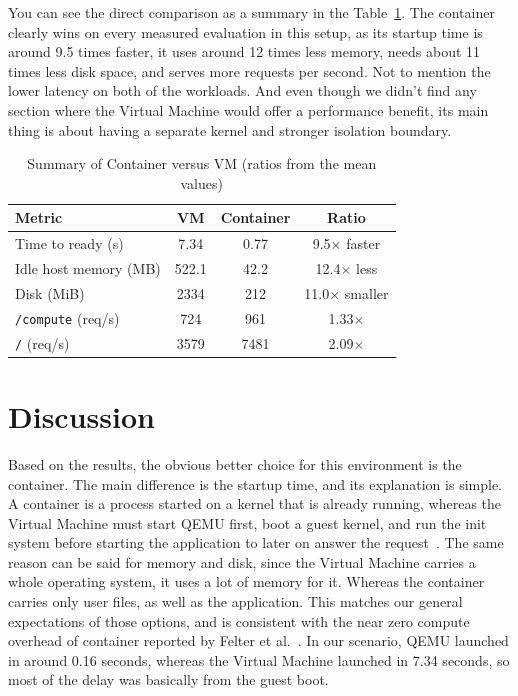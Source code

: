 \documentclass[conference,a4paper]{IEEEtran}
\begin{document}
You can see the direct comparison as a summary in the Table~\ref{tab:summary}. The container clearly wins on every measured evaluation in this setup, as its startup time is around 9.5 times faster, it uses around 12 times less memory, needs about 11 times less disk space, and serves more requests per second. Not to mention the lower latency on both of the workloads. And even though we didn’t find any section where the Virtual Machine would offer a performance benefit, its main thing is about having a separate kernel and stronger isolation boundary.

\begin{table}[htbp]
	\caption{Summary of Container versus VM (ratios from the mean values)}
	\begin{center}
		\footnotesize
		\begin{tabular}{|p{}|c|c|c|}
			\hline
			\textbf{Metric} & \textbf{VM} & \textbf{Container} & \textbf{Ratio} \\
			\hline
			Time to ready (s) & 7.34 & 0.77 & 9.5$\times$ faster \\
			\hline
			Idle host memory (MB) & 522.1 & 42.2 & 12.4$\times$ less \\
			\hline
			Disk (MiB) & 2334 & 212 & 11.0$\times$ smaller \\
			\hline
			\texttt{/compute} (req/s) & 724 & 961 & 1.33$\times$ \\
			\hline
			\texttt{/} (req/s) & 3579 & 7481 & 2.09$\times$ \\
			\hline
		\end{tabular}
		\label{tab:summary}
	\end{center}
\end{table}

\section{Discussion}
\label{sec:discussion}
Based on the results, the obvious better choice for this environment is the container. The main difference is the startup time, and its explanation is simple. A container is a process started on a kernel that is already running, whereas the Virtual Machine must start QEMU first, boot a guest kernel, and run the init system before starting the application to later on answer the request~\cite{b2}. The same reason can be said for memory and disk, since the Virtual Machine carries a whole operating system, it uses a lot of memory for it. Whereas the container carries only user files, as well as the application. This matches our general expectations of those options, and is consistent with the near zero compute overhead of container reported by Felter et al.~\cite{b3}. In our scenario, QEMU launched in around 0.16 seconds, whereas the Virtual Machine launched in 7.34 seconds, so most of the delay was basically from the guest boot.
\end{document}
